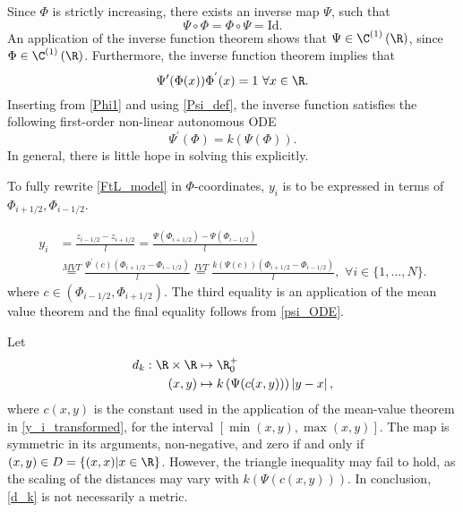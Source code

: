 Since $\Phi$ is strictly increasing, there exists an inverse map $\Psi$, such that
\begin{equation} \label{Psi_def}
	\Psi \circ \Phi = \Phi \circ \Psi = \text{Id}.
\end{equation}
An application of the inverse function theorem shows that $\Psi \in \C^{\left(1\right)}\left(\R\right)$, since $\Phi \in \C^{\left(1\right)}\left(\R\right)$. Furthermore, the inverse function theorem implies that
\begin{equation}
    \Psi'(\Phi(x)) \Phi^{'}(x) = 1 \,\, \forall x \in \R.
\end{equation}
Inserting from \eqref{Phi1} and using \eqref{Psi_def}, the inverse function satisfies the following first-order non-linear autonomous ODE
\begin{equation} \label{psi_ODE}
	\Psi^{'}(\Phi) = k(\Psi(\Phi)). 
\end{equation}
In general, there is little hope in solving this explicitly. 

 
 To fully rewrite \eqref{FtL_model} in $\Phi$-coordinates, $y_i$ is to be expressed in terms of $\Phi_{i+1/2}, \Phi_{i-1/2}$. 

\begin{align} \label{y_i_transformed}
    y_i &= \frac{z_{i-1/2} - z_{i+1/2}}{l} 
     = \frac{\Psi(\Phi_{i+1/2}) - \Psi(\Phi_{i-1/2})}{l} \nonumber \\
     &\overset{MVT}{=} \frac{\Psi^{'}(c) \left(\Phi_{i+1/2} -\Phi_{i-1/2}\right)}{l} \overset{IVT}{=} \frac{k\left(\Psi(c)\right) \left(\Phi_{i+1/2} -\Phi_{i-1/2}\right)}{l}, \, \, \forall i \in \{1,...,N\}.
\end{align}
where $c \in (\Phi_{i-1/2},  \Phi_{i+1/2})$. The third equality is an application of the mean value theorem and the final equality follows from \eqref{psi_ODE}. 

Let 
\begin{align} \label{d_k}
	d_k : \R \times \R &\mapsto \R^+_0 \nonumber \\ 
	(x,y)  &\mapsto k\left(\Psi(c(x,y))\right) \left|y - x\right|,
\end{align} 
where $c(x,y)$ is the constant used in the application of the mean-value theorem in \eqref{y_i_transformed}, for the interval $[\min(x,y), \max(x,y)]$.  The map is symmetric in its arguments, non-negative, and zero if and only if $(x,y) \in D=\{{(x,x)|x\in \R}\}$. However, the triangle inequality may fail to hold, as the scaling of the distances may vary with $k\left(\Psi(c(x,y))\right)$. In conclusion, \eqref{d_k} is not necessarily a metric. %

